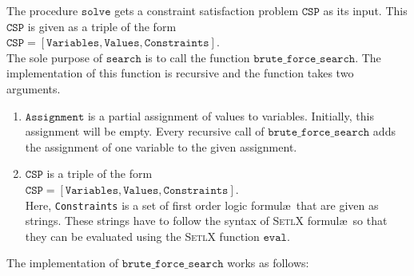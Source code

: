 The procedure $\texttt{solve}$ gets a constraint satisfaction problem $\texttt{CSP}$ as its input.  
This $\texttt{CSP}$ is given as a triple of the form  
\\[0.2cm]
\hspace*{1.3cm}
$\texttt{CSP} = [\texttt{Variables}, \texttt{Values}, \texttt{Constraints}]$.
\\[0.2cm]
The sole purpose of $\texttt{search}$ is to call the function $\texttt{brute\_force\_search}$.  The
implementation of this function is recursive and the function takes two arguments.
\begin{enumerate}
\item $\texttt{Assignment}$ is a partial assignment of values to variables.  Initially, this assignment will be
      empty.  Every recursive call of $\texttt{brute\_force\_search}$ adds the assignment of one variable to
      the given assignment. 
\item $\texttt{CSP}$ is a triple of the form
      \\[0.2cm]
      \hspace*{1.3cm}
      $\texttt{CSP} = [\texttt{Variables}, \texttt{Values}, \texttt{Constraints}]$.
      \\[0.2cm]
      Here, \texttt{Constraints} is a set of first order logic formul\ae\ that are given as strings.  These
      strings have to follow the syntax of \textsc{SetlX} formul\ae\ so that they can be evaluated using the
      \textsc{SetlX} function $\texttt{eval}$.
\end{enumerate}
The implementation of $\texttt{brute\_force\_search}$ works as follows:
